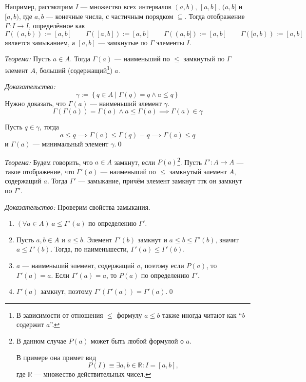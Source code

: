 Например, рассмотрим $I$ --- множество всех интервалов $(a,b)$, $[a,b]$, $(a,b]$
и $[a,b)$, где $a,b$ --- конечные числа, с частичным порядком $\subseteq$.
Тогда отображение $\Gamma:I\to I$, определённое как
\[
	\Gamma((a,b)):=[a,b]\qquad \Gamma([a,b]):=[a,b]\qquad
	\Gamma((a,b]):=[a,b]\qquad \Gamma([a,b)):=[a,b]
\]
является замыканием, а $[a,b]$ --- замкнутые по $\Gamma$ элементы $I$.

\vspace{1em}
{\it Теорема:} Пусть $a\in A$. Тогда $\Gamma(a)$ --- наименьший по $\leq$
замкнутый по $\Gamma$ элемент $A$,
больший (содержащий\footnote{В зависимости от отношения $\leq$ формулу
	$a\leq b$ также иногда читают как ``$b$ содержит $a$''.}) $a$.

	{\it Доказательство:}
\[
	\gamma:=\left\{q\in A\;\big|\; \Gamma(q)=q\land a\leq q\right\}
\]
Нужно доказать, что $\Gamma(a)$ --- наименьший элемент $\gamma$.
\[
	\Gamma(\Gamma(a))=\Gamma(a)\land a\leq\Gamma(a)\implies\Gamma(a)\in\gamma
\]

Пусть $q\in \gamma$, тогда
\[
	a\leq q\implies \Gamma(a)\leq\Gamma(q)=q\implies\Gamma(a)\leq q
\]
и $\Gamma(a)$ --- минимальный элемент $\gamma$.\qed

\newcommand\R{\mathbb R}
\vspace{1em}
{\it Теорема:}
Будем говорить, что ${a\in A}$ замкнут, если $P(a)$\footnote{В данном случае
$P(a)$ может быть любой формулой о $a$.

В примере она примет вид
\[
	P(I)\equiv \exists a,b\in\R:I=[a,b],
\]
где $\R$ --- множество действительных чисел.}.
Пусть ${\Gamma':A\to A}$ --- такое отображение, что $\Gamma'(a)$ --- наименьший по
$\leq$ замкнутый элемент $A$, содержащий $a$. Тогда $\Gamma'$ --- замыкание,
причём элемент замкнут ттк он замкнут по $\Gamma'$.

	{\it Доказательство:}
Проверим свойства замыкания.
\begin{enumerate}
	\item{}$(\forall a\in A)~a\leq \Gamma'(a)$ по определению $\Gamma'$.

	\item{}Пусть $a,b\in A$ и $a\leq b$. Элемент $\Gamma'(b)$ замкнут и
	$a\leq b\leq\Gamma'(b)$, значит $a\leq\Gamma'(b)$. Тогда, по наименьшести,
	$\Gamma'(a)\leq\Gamma'(b)$.

	\item{}$a$ --- наименьший элемент, содержащий $a$, поэтому
	если $P(a)$, то $\Gamma'(a)=a$. Если $\Gamma'(a)=a$, то $P(a)$
	по определению $\Gamma'$.

	\item{}$\Gamma'(a)$ замкнут, поэтому $\Gamma'(\Gamma'(a))=\Gamma'(a)$.\qed
\end{enumerate}

